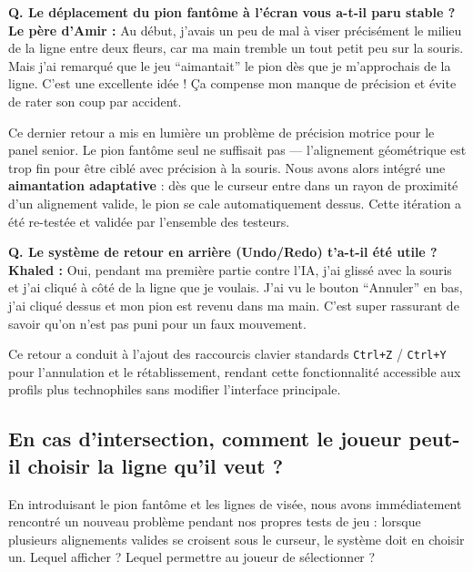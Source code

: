 \documentclass[11pt,a4paper]{article}
\begin{document}
\begin{tcolorbox}[seniorbox, title={Le père d'Amir -- 68 ans, ancien cadre administratif}]
    \textbf{Q. Le déplacement du pion fantôme à l'écran vous a-t-il paru stable ?}\\
    \textbf{Le père d'Amir :} Au début, j'avais un peu de mal à viser précisément le milieu de la ligne entre deux fleurs, car ma main tremble un tout petit peu sur la souris. Mais j'ai remarqué que le jeu ``aimantait'' le pion dès que je m'approchais de la ligne. C'est une excellente idée ! Ça compense mon manque de précision et évite de rater son coup par accident.
\end{tcolorbox}

Ce dernier retour a mis en lumière un problème de précision motrice pour le panel senior. Le pion fantôme seul ne suffisait pas --- l'alignement géométrique est trop fin pour être ciblé avec précision à la souris. Nous avons alors intégré une \textbf{aimantation adaptative} : dès que le curseur entre dans un rayon de proximité d'un alignement valide, le pion se cale automatiquement dessus. Cette itération a été re-testée et validée par l'ensemble des testeurs.

\begin{tcolorbox}[nongamerbox, title={Khaled -- 24 ans, alternant en commerce}]
    \textbf{Q. Le système de retour en arrière (Undo/Redo) t'a-t-il été utile ?}\\
    \textbf{Khaled :} Oui, pendant ma première partie contre l'IA, j'ai glissé avec la souris et j'ai cliqué à côté de la ligne que je voulais. J'ai vu le bouton ``Annuler'' en bas, j'ai cliqué dessus et mon pion est revenu dans ma main. C'est super rassurant de savoir qu'on n'est pas puni pour un faux mouvement.
\end{tcolorbox}

Ce retour a conduit à l'ajout des raccourcis clavier standards \texttt{Ctrl+Z} / \texttt{Ctrl+Y} pour l'annulation et le rétablissement, rendant cette fonctionnalité accessible aux profils plus technophiles sans modifier l'interface principale.

\subsection{En cas d'intersection, comment le joueur peut-il choisir la ligne qu'il veut ?}

En introduisant le pion fantôme et les lignes de visée, nous avons immédiatement rencontré un nouveau problème pendant nos propres tests de jeu : lorsque plusieurs alignements valides se croisent sous le curseur, le système doit en choisir un. Lequel afficher ? Lequel permettre au joueur de sélectionner ?
\end{document}
